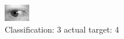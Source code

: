 \begin{figure}[h!]
\begin{center}
\includegraphics[width=0.60\columnwidth]{figures/ID691_class_3_target_4.png}
\end{center}
\caption{ Classification: 3 actual target: 4}
\label{fig:ID691_class_3_target_4}
\end{figure}
